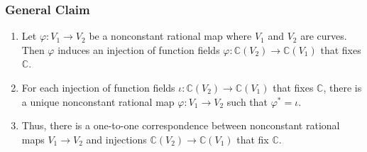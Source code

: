 \documentclass{beamer}
\theoremstyle{definition}
\begin{document}
    \begin{frame}
        \frametitle{General Claim}
        \begin{enumerate}
            \item Let \(\varphi: V_1\to V_2\) be a nonconstant rational map where \(V_1\) and \(V_2\) are curves. Then \(\varphi\) induces an injection of function fields \(\varphi: \mathbb{C}(V_2) \to \mathbb{C}(V_1)\) that fixes \(\mathbb{C}\).

            \item For each injection of function fields \(\iota : \mathbb{C}(V_2)\to \mathbb{C}(V_1)\) that fixes \(\mathbb{C}\), there is a unique nonconstant rational map \(\varphi: V_1 \to V_2\) such that \(\varphi^\ast = \iota\).

            \item Thus, there is a one-to-one correspondence between nonconstant rational maps \(V_1 \to V_2\) and injections \(\mathbb{C}(V_2) \to \mathbb{C}(V_1)\) that fix \(\mathbb{C}\).
    \end{enumerate}
    \end{frame}
\end{document}
